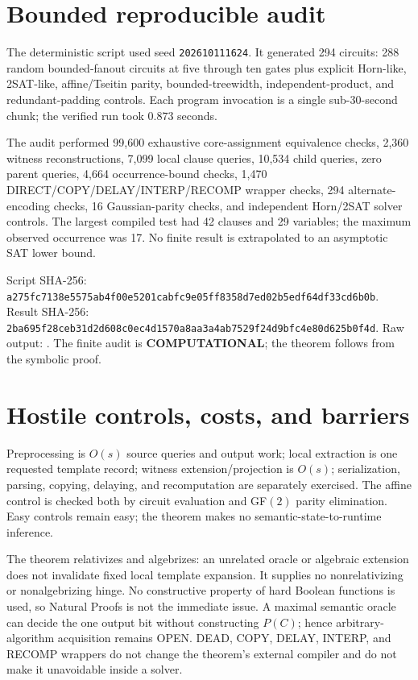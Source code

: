 \documentclass[11pt]{article}
\newcommand{\COMP}{\textbf{COMPUTATIONAL}}
\begin{document}
\section{Bounded reproducible audit}

The deterministic script
 used seed
\texttt{202610111624}.  It generated 294 circuits: 288 random
bounded-fanout circuits at five through ten gates plus explicit Horn-like,
2SAT-like, affine/Tseitin parity, bounded-treewidth, independent-product,
and redundant-padding controls.  Each program invocation is a single
sub-30-second chunk; the verified run took $0.873$ seconds.

The audit performed 99,600 exhaustive core-assignment equivalence checks,
2,360 witness reconstructions, 7,099 local clause queries, 10,534 child
queries, zero parent queries, 4,664 occurrence-bound checks, 1,470
DIRECT/COPY/DELAY/INTERP/RECOMP wrapper checks, 294 alternate-encoding
checks, 16 Gaussian-parity checks, and independent Horn/2SAT solver
controls.  The largest compiled test had 42 clauses and 29 variables; the
maximum observed occurrence was 17.  No finite result is extrapolated to
an asymptotic SAT lower bound.

Script SHA-256:
\texttt{a275fc7138e5575ab4f00e5201cabfc9e05ff8358d7ed02b5edf64df33cd6b0b}.
Result SHA-256:
\texttt{2ba695f28ceb31d2d608c0ec4d1570a8aa3a4ab7529f24d9bfc4e80d625b0f4d}.
Raw output:
.
The finite audit is \COMP; the theorem follows from the symbolic proof.

\section{Hostile controls, costs, and barriers}

Preprocessing is $O(s)$ source queries and output work; local extraction is
one requested template record; witness extension/projection is $O(s)$;
serialization, parsing, copying, delaying, and recomputation are separately
exercised.  The affine control is checked both by circuit evaluation and
GF$(2)$ parity elimination.  Easy controls remain easy; the theorem makes
no semantic-state-to-runtime inference.

The theorem relativizes and algebrizes: an unrelated oracle or algebraic
extension does not invalidate fixed local template expansion.  It supplies
no nonrelativizing or nonalgebrizing hinge.  No constructive property of
hard Boolean functions is used, so Natural Proofs is not the immediate
issue.  A maximal semantic oracle can decide the one output bit without
constructing $P(C)$; hence arbitrary-algorithm acquisition remains OPEN.
DEAD, COPY, DELAY, INTERP, and RECOMP wrappers do not change the theorem's
external compiler and do not make it unavoidable inside a solver.
\end{document}
